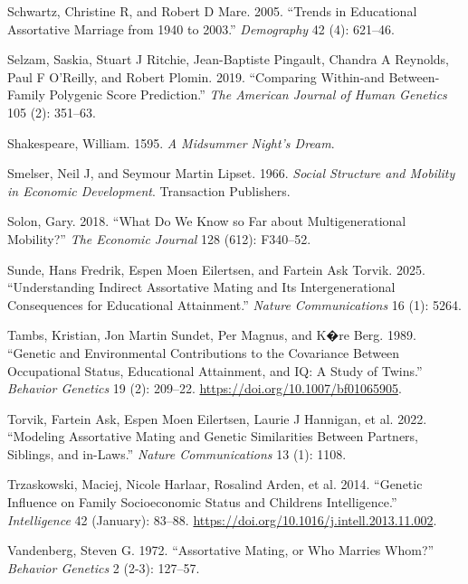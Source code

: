 \documentclass[
  12pt,
]{article}
\newlength{\cslhangindent}
\newenvironment{CSLReferences}[2] %
 {\begin{list}{}{%
  \setlength{\itemindent}{0pt}
  \setlength{\leftmargin}{0pt}
  \setlength{\parsep}{0pt}
  \ifodd #1
   \setlength{\leftmargin}{\cslhangindent}
   \setlength{\itemindent}{-1\cslhangindent}
  \fi
  \setlength{\itemsep}{#2\baselineskip}}}
 {\end{list}}
\theoremstyle{definition}
\theoremstyle{definition}
\theoremstyle{definition}
\theoremstyle{definition}
\theoremstyle{remark}
\begin{document}
\begin{CSLReferences}{1}{1}
Schwartz, Christine R, and Robert D Mare. 2005. {``Trends in Educational Assortative Marriage from 1940 to 2003.''} \emph{Demography} 42 (4): 621--46.

Selzam, Saskia, Stuart J Ritchie, Jean-Baptiste Pingault, Chandra A Reynolds, Paul F O'Reilly, and Robert Plomin. 2019. {``Comparing Within-and Between-Family Polygenic Score Prediction.''} \emph{The American Journal of Human Genetics} 105 (2): 351--63.

Shakespeare, William. 1595. \emph{A Midsummer Night's Dream}.

Smelser, Neil J, and Seymour Martin Lipset. 1966. \emph{Social Structure and Mobility in Economic Development}. Transaction Publishers.

Solon, Gary. 2018. {``What Do We Know so Far about Multigenerational Mobility?''} \emph{The Economic Journal} 128 (612): F340--52.

Sunde, Hans Fredrik, Espen Moen Eilertsen, and Fartein Ask Torvik. 2025. {``Understanding Indirect Assortative Mating and Its Intergenerational Consequences for Educational Attainment.''} \emph{Nature Communications} 16 (1): 5264.

Tambs, Kristian, Jon Martin Sundet, Per Magnus, and K�re Berg. 1989. {``Genetic and Environmental Contributions to the Covariance Between Occupational Status, Educational Attainment, and {IQ}: A Study of Twins.''} \emph{Behavior Genetics} 19 (2): 209--22. \url{https://doi.org/10.1007/bf01065905}.

{Torvik, Fartein Ask, Espen Moen Eilertsen, Laurie J Hannigan, et al.} 2022. {``Modeling Assortative Mating and Genetic Similarities Between Partners, Siblings, and in-Laws.''} \emph{Nature Communications} 13 (1): 1108.

Trzaskowski, Maciej, Nicole Harlaar, Rosalind Arden, et al. 2014. {``Genetic Influence on Family Socioeconomic Status and Children{\textquotesingle{}}s Intelligence.''} \emph{Intelligence} 42 (January): 83--88. \url{https://doi.org/10.1016/j.intell.2013.11.002}.

Vandenberg, Steven G. 1972. {``Assortative Mating, or Who Marries Whom?''} \emph{Behavior Genetics} 2 (2-3): 127--57.


\end{CSLReferences}
\end{document}
